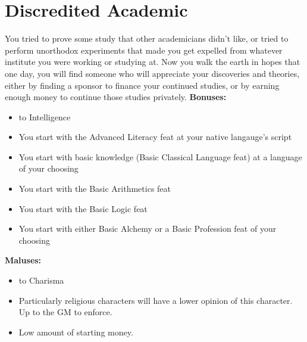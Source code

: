 \section{Discredited Academic}
You tried to prove some study that other academicians didn't like, or tried to perform unorthodox experiments that made you get expelled from whatever institute you were working or studying at. Now you walk the earth in hopes that one day, you will find someone who will appreciate your discoveries and theories, either by finding a sponsor to finance your continued studies, or by earning enough money to continue those studies privately.\newline
\textbf{Bonuses:}
\begin{itemize}
	\item {} to Intelligence
	\item You start with the Advanced Literacy feat at your native langauge's script
	\item You start with basic knowledge (Basic Classical Language feat) at a language of your choosing
	\item You start with the Basic Arithmetics feat
	\item You start with the Basic Logic feat
	\item You start with either Basic Alchemy or a Basic Profession feat of your choosing
\end{itemize}
\textbf{Maluses:}
\begin{itemize}
	\item {} to Charisma
	\item Particularly religious characters will have a lower opinion of this character. Up to the GM to enforce.
	\item Low amount of starting money.
\end{itemize}
